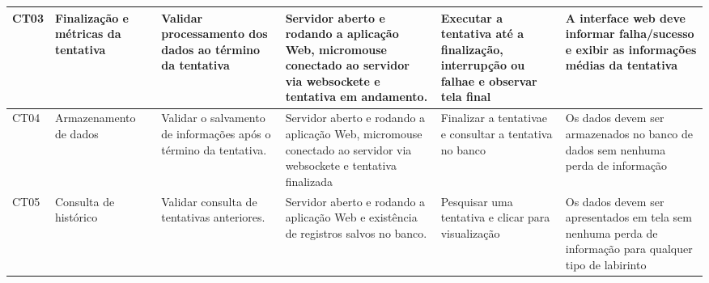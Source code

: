 \begin{table}[H]
\begin{tabular}{|p{0.9cm}|p{2.3cm}|p{2.3cm}|p{3cm}|p{3cm}|p{3.2cm}|}
        CT03 & Finalização e métricas da tentativa & Validar processamento dos dados ao término da tentativa                & Servidor aberto e rodando a aplicação Web, micromouse conectado ao servidor via websockete e tentativa em andamento.            & Executar a tentativa até a finalização, interrupção ou falhae e observar tela final                                              & A interface web deve informar falha/sucesso e exibir as informações médias da tentativa                                                                                           \\ \hline
        CT04 & Armazenamento de dados              & Validar o salvamento de informações após o término da tentativa.       & Servidor aberto e rodando a aplicação Web, micromouse conectado ao servidor via websockete e tentativa finalizada               & Finalizar a tentativae e consultar a tentativa no banco                                                                          & Os dados devem ser armazenados no banco de dados sem nenhuma perda de informação                                                                                                   \\ \hline
        CT05 & Consulta de histórico               & Validar consulta de tentativas anteriores.                             & Servidor aberto e rodando a aplicação Web e existência de registros salvos no banco.                                            & Pesquisar uma tentativa e clicar para visualização                                                                             & Os dados devem ser apresentados em tela sem nenhuma perda de informação para qualquer tipo de labirinto \\ \hline
        \end{tabular}
    \end{table}

